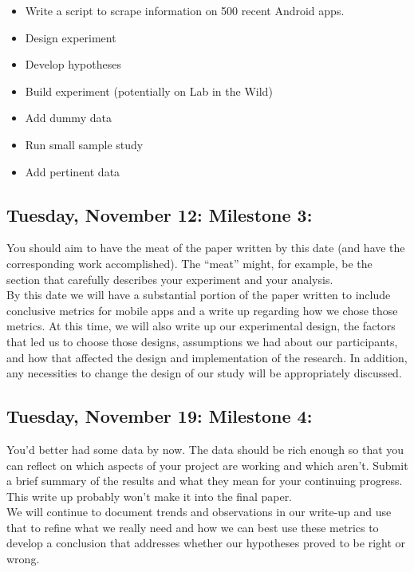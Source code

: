 \documentclass{article}
\begin{document}
\begin{itemize}
\item Write a script to scrape information on 500 recent Android apps.
\item Design experiment
\item Develop hypotheses
\item Build experiment (potentially on Lab in the Wild)
\item Add dummy data
\item Run small sample study
\item Add pertinent data
\end{itemize}

\subsection{Tuesday, November 12: Milestone 3:}

You should aim to have the meat of the paper written by this date (and have the corresponding work accomplished). The “meat” might, for example, be the section that carefully describes your experiment and your analysis. \\

	By this date we will have a substantial portion of the paper written to include conclusive metrics for mobile apps and a write up regarding how we chose those metrics.  At this time, we will also write up our experimental design, the factors that led us to choose those designs, assumptions we had about our participants, and how that affected the design and implementation of the research. In addition, any necessities to change the design of our study will be appropriately discussed. \\

\subsection{Tuesday, November 19: Milestone 4:}

You’d better had some data by now. The data should be rich enough so that you can reflect on which aspects of your project are working and which aren't. Submit a brief summary of the results and what they mean for your continuing progress. This write up probably won’t make it into the final paper. \\

	We will continue to document trends and observations in our write-up and use that to refine what we really need and how we can best use these metrics to develop a conclusion that addresses whether our hypotheses proved to be right or wrong. \\
\end{document}
